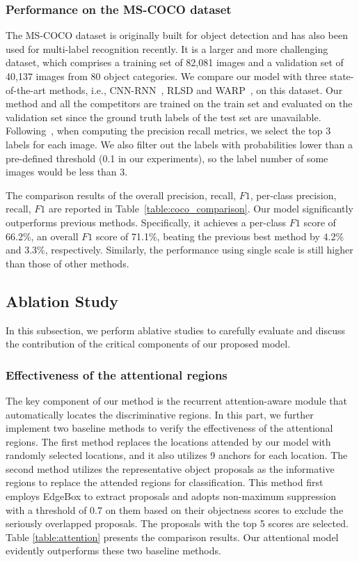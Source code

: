 \documentclass[letterpaper]{article} %
\begin{document}
\subsubsection{Performance on the MS-COCO dataset}
The MS-COCO dataset is originally built for object detection and has also been used for multi-label recognition recently. It is a larger and more challenging dataset, which comprises a training set of 82,081 images and a validation set of 40,137 images from 80 object categories. We compare our model with three state-of-the-art methods, i.e., CNN-RNN~\cite{wang2016cnn}, RLSD \cite{zhang2016multi} and WARP~\cite{gong2013deep}, on this dataset. Our method and all the competitors are trained on the train set and evaluated on the validation set since the ground truth labels of the test set are unavailable. Following~\cite{wang2016cnn}, when computing the precision recall metrics, we select the top 3 labels for each image. We also filter out the labels with probabilities lower than a pre-defined threshold (0.1 in our experiments), so the label number of some images would be less than 3.

The comparison results of the overall precision, recall, $F1$, per-class precision, recall, $F1$ are reported in Table~\ref{table:coco_comparison}. Our model significantly outperforms previous methods. Specifically, it achieves a per-class $F1$ score of 66.2\%, an overall $F1$ score of 71.1\%, beating the previous best method by 4.2\% and 3.3\%, respectively.  Similarly, the performance using single scale is still higher than those of other methods.


\subsection{Ablation Study}
In this subsection, we perform ablative studies to carefully evaluate and discuss the contribution of the critical components of our proposed model.

\subsubsection{Effectiveness of the attentional regions} 
The key component of our method is the recurrent attention-aware module that automatically locates the discriminative regions. In this part, we further implement two baseline methods to verify the effectiveness of the attentional regions. The first method replaces the locations attended by our model with randomly selected locations, and it also utilizes 9 anchors for each location. The second method utilizes the representative object proposals as the informative regions to replace the attended regions for classification. This method first employs EdgeBox \cite{zitnick2014edge} to extract proposals and adopts non-maximum suppression with a threshold of 0.7 on them based on their objectness scores to exclude the seriously overlapped proposals. The proposals with the top 5 scores are selected. Table \ref{table:attention} presents the comparison results. Our attentional model evidently outperforms these two baseline methods.
\end{document}

